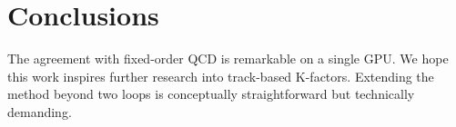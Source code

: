 \section{Conclusions}\label{sec:conclusions}

The agreement with fixed-order QCD is remarkable on a single GPU. We
hope this work inspires further research into track-based K-factors.
Extending the method beyond two loops is conceptually straightforward
but technically demanding.

